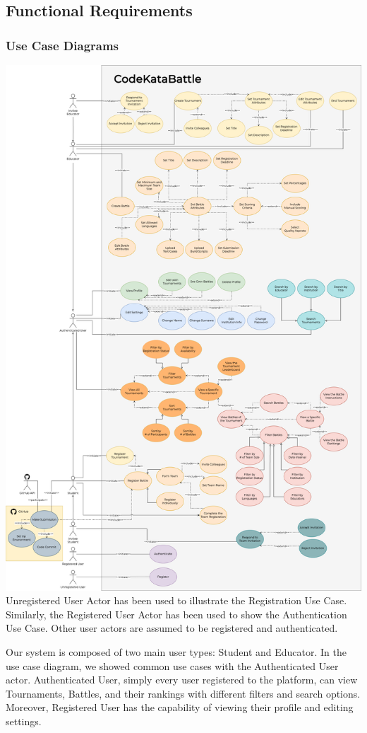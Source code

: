 \subsection{Functional Requirements}
\subsubsection{Use Case Diagrams}
\includegraphics[scale=0.27]{Images/use-case-diagrams.drawio.png}
\newpage
\quad Unregistered User Actor has been used to illustrate the Registration Use Case. Similarly, the Registered User Actor has been used to show the Authentication Use Case. Other user actors are assumed to be registered and authenticated.

\quad Our system is composed of two main user types: Student and Educator. In the use case diagram, we showed common use cases with the Authenticated User actor. Authenticated User, simply every user registered to the platform, can view Tournaments, Battles, and their rankings with different filters and search options. Moreover, Registered User has the capability of viewing their profile and editing settings.

